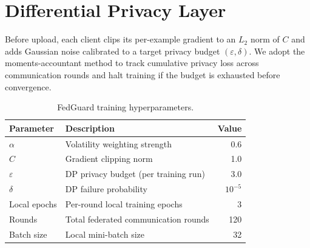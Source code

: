 \section{Differential Privacy Layer}
Before upload, each client clips its per-example gradient to an $L_2$ norm of $C$ and
adds Gaussian noise calibrated to a target privacy budget $(\varepsilon, \delta)$. We
adopt the moments-accountant method to track cumulative privacy loss across
communication rounds and halt training if the budget is exhausted before convergence.

\begin{table}[htbp]
\centering
\caption{FedGuard training hyperparameters.}
\label{tab:hyperparams}
\begin{tabularx}{0.85\textwidth}{@{}l X r@{}}
\toprule
\textbf{Parameter} & \textbf{Description} & \textbf{Value} \\
\midrule
$\alpha$ & Volatility weighting strength & 0.6 \\
$C$ & Gradient clipping norm & 1.0 \\
$\varepsilon$ & DP privacy budget (per training run) & 3.0 \\
$\delta$ & DP failure probability & $10^{-5}$ \\
Local epochs & Per-round local training epochs & 3 \\
Rounds & Total federated communication rounds & 120 \\
Batch size & Local mini-batch size & 32 \\
\bottomrule
\end{tabularx}
\end{table}
